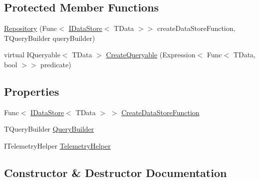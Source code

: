 \subsection*{Protected Member Functions}
\begin{DoxyCompactItemize}
\item 
\hyperlink{classCqrs_1_1Repositories_1_1Repository_a2f4009847fa03a897c6698fd5a92d89f}{Repository} (Func$<$ \hyperlink{interfaceCqrs_1_1DataStores_1_1IDataStore}{I\+Data\+Store}$<$ T\+Data $>$$>$ create\+Data\+Store\+Function, T\+Query\+Builder query\+Builder)
\item 
virtual I\+Queryable$<$ T\+Data $>$ \hyperlink{classCqrs_1_1Repositories_1_1Repository_ab95fc66b24e8359a1e2f48a3ca2f14c1}{Create\+Queryable} (Expression$<$ Func$<$ T\+Data, bool $>$$>$ predicate)
\end{DoxyCompactItemize}
\subsection*{Properties}
\begin{DoxyCompactItemize}
\item 
Func$<$ \hyperlink{interfaceCqrs_1_1DataStores_1_1IDataStore}{I\+Data\+Store}$<$ T\+Data $>$ $>$ \hyperlink{classCqrs_1_1Repositories_1_1Repository_ae15cee6394a223564ad2ead65cd30189}{Create\+Data\+Store\+Function}
\item 
T\+Query\+Builder \hyperlink{classCqrs_1_1Repositories_1_1Repository_a4447451b7dbcfcd68dfa3fa65a41f357}{Query\+Builder}
\item 
I\+Telemetry\+Helper \hyperlink{classCqrs_1_1Repositories_1_1Repository_aae263dc1dda61f89c011be6d578620bd}{Telemetry\+Helper}
\end{DoxyCompactItemize}


\subsection{Constructor \& Destructor Documentation}
\mbox{\label{classCqrs_1_1Repositories_1_1Repository_a2f4009847fa03a897c6698fd5a92d89f}} 
